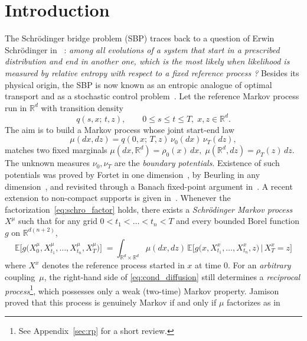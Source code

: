\documentclass[a4paper,11pt]{amsart}
\theoremstyle{plain}
\theoremstyle{remark}
\newcommand{\R}{\mathbb{R}}
\newcommand{\E}{\mathbb{E}}
\begin{document}
\section{Introduction}\label{intro}
The  Schr\"odinger bridge problem (SBP) traces back to a question of Erwin Schr\"odinger in ~\cite{schrodinger1932}:  
\emph{among all evolutions of a system that start in a prescribed distribution and end in another one, which is the most likely when likelihood is measured by relative entropy with respect to a fixed reference process ?}  
Besides its physical origin, the SBP is now known as an entropic analogue of optimal transport and as a stochastic control problem~\cite{leonard2014,daipra1991}.
Let the reference Markov process run in $\R^{d}$ with transition density
\[
  q(s,x;\,t,z), \qquad 0\le s\le t\le T,\; x,z\in\R^{d}.
\]
The aim is to build a Markov process whose joint start-end law
\begin{equation}\label{eq:schro_factor}
  \mu(dx,dz)=q(0,x;\,T,z)\,\nu_{0}(dx)\,\nu_{T}(dz),
\end{equation}
matches two fixed marginals 
\(
  \mu(dx,\R^{d})=\rho_{0}(x)\,dx,\;
  \mu(\R^{d},dz)=\rho_{T}(z)\,dz .
\)
The unknown measures $\nu_{0},\nu_{T}$ are the \emph{boundary
potentials}.  Existence of such potentials was proved by Fortet in one
dimension~\cite{Fortet}, by Beurling in any dimension~\cite{Beur}, and
revisited through a Banach fixed-point argument in~\cite{CGP2016}.  A
recent extension to non-compact supports is given in~\cite{eckstein2025hilbert}.  
Whenever the factorization~\eqref{eq:schro_factor} holds, there exists a
\emph{Schr\"odinger Markov process} $X^{\mu}$ such that for any grid
$0<t_{1}<\dots<t_{n}<T$ and every bounded Borel function $g$ on $\mathbb{R}^{d(n+2)}$,
\begin{equation}\label{eq:cond_diffusion}
  \E\!\bigl[
       g\bigl(X_{0}^{\mu},X_{t_{1}}^{\mu},\dots,X_{t_{n}}^{\mu},X_{T}^{\mu}\bigr)
     \bigr]
  \;=\!
  \int_{\R^{d}\times\R^{d}}
    \mu(dx,dz)\,
    \E\!\bigl[
      g\bigl(x,X_{t_{1}}^{x},\dots,X_{t_{n}}^{x},z\bigr)\,
      \big|\,X_{T}^{x}=z
    \bigr]
\end{equation}
where $X^{x}$ denotes the reference process started in $x$ at time $0$.
For an \emph{arbitrary} coupling~$\mu$, the right-hand side of
\eqref{eq:cond_diffusion} still determines a \emph{reciprocal
process}\footnote{See Appendix~\ref{sec:rp} for a short review.}, which
possesses only a weak (two-time) Markov property.  Jamison~\cite{Jam74} proved that
this process is genuinely Markov if and only if $\mu$ factorizes as in
\end{document}
